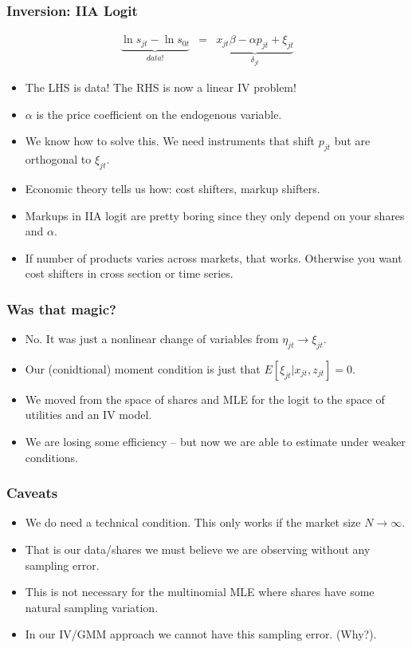 \documentclass[xcolor=pdftex,dvipsnames,table,mathserif,aspectratio=169]{beamer}
\begin{document}
\begin{frame}
\frametitle{Inversion: IIA Logit}
\begin{eqnarray*}
\underbrace{\ln s_{jt}- \ln s_{0t}}_{data!}&=& \underbrace{x_{jt} \beta -\alpha p_{jt} +  \xi_{jt}}_{\delta_{jt}}
\end{eqnarray*}
 \begin{itemize}
\item The LHS is data! The RHS is now a linear IV problem!
\item $\alpha$ is the price coefficient on the endogenous variable.
\item We know how to solve this. We need instruments that shift $p_{jt}$ but are orthogonal to $\xi_{jt}$.
\item Economic theory tells us how: cost shifters, markup shifters.
\item Markups in IIA logit are pretty boring since they only depend on your shares and $\alpha$.
\item If number of products varies across markets, that works. Otherwise you want cost shifters in cross section or time series.
 \end{itemize}
\end{frame}


\begin{frame}
\frametitle{Was that magic?}
\begin{itemize}
\item No. It was just a nonlinear change of variables from $\eta_{jt} \rightarrow \xi_{jt}$.
\item Our (conidtional) moment condition is just that $E[\xi_{jt} | x_{jt}, z_{jt}]=0$.
\item We moved from the space of shares and MLE for the logit to the space of utilities and an IV model.
\item We are losing some efficiency -- but now we are able to estimate under weaker conditions.
 \end{itemize}
\end{frame}

\begin{frame}
\frametitle{Caveats}
\begin{itemize}
\item We do need a technical condition. This only works if the market size $N \rightarrow \infty$.
\item That is our data/shares we must believe we are observing without any sampling error.
\item This is not necessary for the multinomial MLE where shares have some natural sampling variation.
\item In our IV/GMM approach we cannot have this sampling error. (Why?).
 \end{itemize}
\end{frame}
\end{document}
